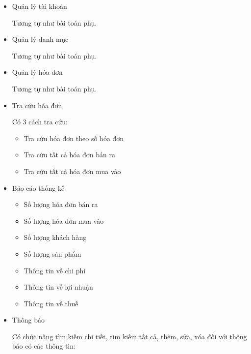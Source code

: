 \begin{itemize}

\item Quản lý tài khoản

Tương tự như bài toán phụ.

\item Quản lý danh mục

Tương tự như bài toán phụ.

\item Quản lý hóa đơn

Tương tự như bài toán phụ.

\item Tra cứu hóa đơn

Có 3 cách tra cứu:

\begin{itemize}

\item Tra cứu hóa đơn theo số hóa đơn

\item Tra cứu tất cả hóa đơn bán ra

\item Tra cứu tất cả hóa đơn mua vào

\end{itemize}

\item Báo cáo thống kê

\begin{itemize}

\item Số lượng hóa đơn bán ra

\item Số lượng hóa đơn mua vào

\item Số lượng khách hàng

\item Số lượng sản phẩm

\item Thông tin về chi phí

\item Thông tin về lợi nhuận

\item Thông tin về thuế

\end{itemize}

\item Thông báo

Có chức năng tìm kiếm chi tiết, tìm kiếm tất cả, thêm, sửa, xóa đối với thông báo có các thông tin:


\end{itemize}
